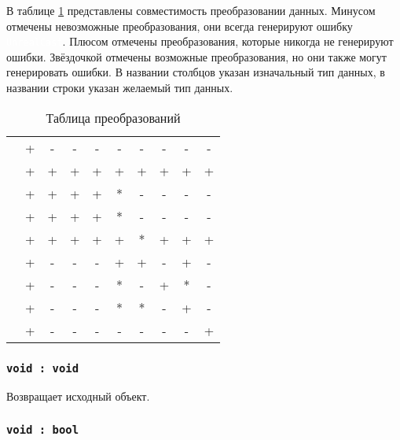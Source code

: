 \documentclass[a4paper, 14pt]{extarticle}
\newcommand{\ferror}[1]{{\fontsize{11pt}{12pt} \tt \colorbox{function}{\textcolor{white}{#1}}}}
\begin{document}
В таблице \ref{castingtable} представлены совместимость преобразовании данных. Минусом отмечены невозможные преобразования, они всегда генерируют ошибку \ferror{UnrealCast}. Плюсом отмечены преобразования, которые никогда не генерируют ошибки. Звёздочкой отмечены возможные преобразования, но они также могут генерировать ошибки. В названии столбцов указан изначальный тип данных, в названии строки указан желаемый тип данных.

\begin{table}[htb]
	\caption{Таблица преобразований}
	\label{castingtable}
	\begin{tabular}{|l|c|c|c|c|c|c|c|c|c|}
		\hline
		          & \void & \bool & \integer & \double & \str & \listtype & \object & \set & \element \\ \hline
		\void     & +     & -     & -        & -       & -    & -         & -       & -    & -        \\ \hline
		\bool     & +     & +     & +        & +       & +    & +         & +       & +    & +        \\ \hline
		\integer  & +     & +     & +        & +       & *    & -         & -       & -    & -        \\ \hline
		\double   & +     & +     & +        & +       & *    & -         & -       & -    & -        \\ \hline
		\str      & +     & +     & +        & +       & +    & *         & +       & +    & +        \\ \hline
		\listtype & +     & -     & -        & -       & +    & +         & -       & +    & -        \\ \hline
		\object   & +     & -     & -        & -       & *    & -         & +       & *    & -        \\ \hline
		\set      & +     & -     & -        & -       & *    & *         & -       & +    & -        \\ \hline
		\element  & +     & -     & -        & -       & -    & -         & -       & -    & +        \\ \hline
	\end{tabular}
\end{table}

\subsubsection{\lstinline|void : void|}

Возвращает исходный объект.

\subsubsection{\lstinline|void : bool|}
\end{document}
